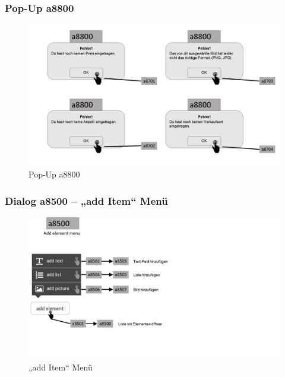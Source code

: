 \documentclass[a4paper,12pt,oneside]{scrartcl}
\begin{document}
\subsubsection{Pop-Up a8800}
\begin{figure}[!htbp]
\centering
\noindent\includegraphics[width=\linewidth,height=\textheight,keepaspectratio]{Dialoge/a8800p}
\caption{Pop-Up a8800}
\end{figure}
\FloatBarrier

\subsubsection{Dialog a8500 – „add Item“ Menü}
\begin{figure}[!htbp]
\centering
\noindent\includegraphics[width=\linewidth,height=\textheight,keepaspectratio]{Dialoge/a8500}
\caption{„add Item“ Menü}
\end{figure}
\FloatBarrier
\end{document}

